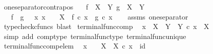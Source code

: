 \begin{isabellebody}
\isanewline
{}\isamarkupfalse%
\ one{\isacharunderscore}{\kern0pt}separator{\isacharunderscore}{\kern0pt}contrapos{\isacharcolon}{\kern0pt}\isanewline
\ \ \ {\isachardoublequoteopen}f\ {\isacharcolon}{\kern0pt}\ X\ {\isasymrightarrow}\ Y{\isachardoublequoteclose}\ {\isachardoublequoteopen}g\ {\isacharcolon}{\kern0pt}\ X\ {\isasymrightarrow}\ Y{\isachardoublequoteclose}\isanewline
\ \ \ {\isachardoublequoteopen}f\ {\isasymnoteq}\ g\ {\isasymLongrightarrow}\ {\isasymexists}\ x{\isachardot}{\kern0pt}\ x\ {\isacharcolon}{\kern0pt}\ {\isasymone}\ {\isasymrightarrow}\ X\ {\isasymand}\ f\ {\isasymcirc}\isactrlsub c\ x\ {\isasymnoteq}\ g\ {\isasymcirc}\isactrlsub c\ x{\isachardoublequoteclose}\isanewline
%
\isadelimproof
\ \ %
\endisadelimproof
%
\isatagproof
{}\isamarkupfalse%
\ assms\ one{\isacharunderscore}{\kern0pt}separator\ \isamarkupfalse%
\ {\isacharparenleft}{\kern0pt}typecheck{\isacharunderscore}{\kern0pt}cfuncs{\isacharcomma}{\kern0pt}\ blast{\isacharparenright}{\kern0pt}%
\endisatagproof
{\isafoldproof}%
%
\isadelimproof
\isanewline
%
\endisadelimproof
\isanewline
{}\isamarkupfalse%
\ terminal{\isacharunderscore}{\kern0pt}func{\isacharunderscore}{\kern0pt}comp{\isacharcolon}{\kern0pt}\isanewline
\ \ {\isachardoublequoteopen}x\ {\isacharcolon}{\kern0pt}\ X\ {\isasymrightarrow}\ Y\ {\isasymLongrightarrow}\ {\isasymbeta}\isactrlbsub Y\isactrlesub \ {\isasymcirc}\isactrlsub c\ x\ {\isacharequal}{\kern0pt}\ {\isasymbeta}\isactrlbsub X\isactrlesub {\isachardoublequoteclose}\isanewline
%
\isadelimproof
\ \ %
\endisadelimproof
%
\isatagproof
{}\isamarkupfalse%
\ {\isacharparenleft}{\kern0pt}simp\ add{\isacharcolon}{\kern0pt}\ comp{\isacharunderscore}{\kern0pt}type\ terminal{\isacharunderscore}{\kern0pt}func{\isacharunderscore}{\kern0pt}type\ terminal{\isacharunderscore}{\kern0pt}func{\isacharunderscore}{\kern0pt}unique{\isacharparenright}{\kern0pt}%
\endisatagproof
{\isafoldproof}%
%
\isadelimproof
\isanewline
%
\endisadelimproof
\isanewline
{}\isamarkupfalse%
\ terminal{\isacharunderscore}{\kern0pt}func{\isacharunderscore}{\kern0pt}comp{\isacharunderscore}{\kern0pt}elem{\isacharcolon}{\kern0pt}\isanewline
\ \ {\isachardoublequoteopen}x\ {\isacharcolon}{\kern0pt}\ {\isasymone}\ {\isasymrightarrow}\ X\ {\isasymLongrightarrow}\ {\isasymbeta}\isactrlbsub X\isactrlesub \ {\isasymcirc}\isactrlsub c\ x\ {\isacharequal}{\kern0pt}\ id\ {\isasymone}{\isachardoublequoteclose}\isanewline
%
\isadelimproof
\ \ %
\endisadelimproof
%
\isatagproof

\end{isabellebody}
